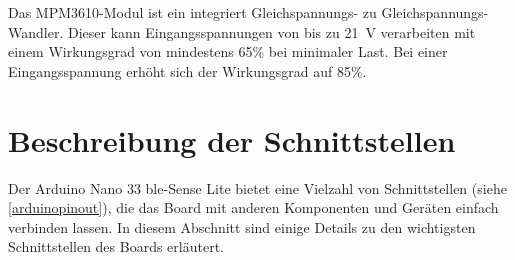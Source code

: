 Das MPM3610-Modul ist ein integriert Gleichspannungs- zu Gleichspannungs-Wandler. Dieser kann Eingangsspannungen von bis zu 21\ V verarbeiten mit einem Wirkungsgrad von mindestens 65\% bei minimaler Last. Bei einer Eingangsspannung erhöht sich der Wirkungsgrad auf 85\%.\cite{Ard.2024}

\section{Beschreibung der Schnittstellen}

Der Arduino Nano 33 \ac{ble}-Sense Lite bietet eine Vielzahl von Schnittstellen (siehe \autoref{arduinopinout}), die das Board mit anderen Komponenten und Geräten einfach verbinden lassen. In diesem Abschnitt sind einige Details zu den wichtigsten Schnittstellen des Boards erläutert.

